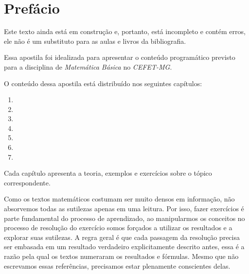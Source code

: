 \chapter*{Prefácio}

\vspace{3cm}
\begin{observation}
  Este texto ainda está em construção e, portanto, está incompleto e contém erros,
  ele não é um substituto para as aulas e livros da bibliografia.
\end{observation}
\vspace{3cm}

Essa apostila foi idealizada para apresentar o conteúdo programático previsto para
a disciplina de \emph{Matemática Básica} no \emph{CEFET-MG}.

O conteúdo dessa apostila está distribuído nos seguintes capítulos:
\vspace{-0.5\baselineskip}
\begin{enumerate}[nosep]
  \item {}
  \item {}
  \item {}
  \item {}
  \item {}
  \item {}
  \item {}
\end{enumerate}
Cada capítulo apresenta a teoria, exemplos e exercícios sobre o tópico correspondente.

Como os textos matemáticos costumam ser muito densos em informação,
não absorvemos todas as sutilezas apenas em uma leitura. Por isso, fazer exercícios é
parte fundamental do processo de aprendizado, ao manipularmos os conceitos no processo
de resolução do exercício somos forçados a utilizar os resultados e a explorar suas
sutilezas. A regra geral é que cada passagem da resolução precisa ser embasada em um
resultado verdadeiro explicitamente descrito antes, essa é a razão pela qual os textos
numeraram os resultados e fórmulas. Mesmo que não escrevamos essas referências,
precisamos estar plenamente conscientes delas.

